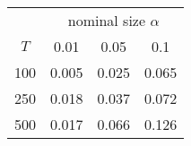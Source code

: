 % 
\begin{tabular}{cccc}
  \hline
  & \multicolumn{3}{c}{nominal size $\alpha$} \\
 $T$ & 0.01 & 0.05 & 0.1 \\
 \hline
100 & 0.005 & 0.025 & 0.065 \\ 
  250 & 0.018 & 0.037 & 0.072 \\ 
  500 & 0.017 & 0.066 & 0.126 \\ 
   \hline
\end{tabular}
